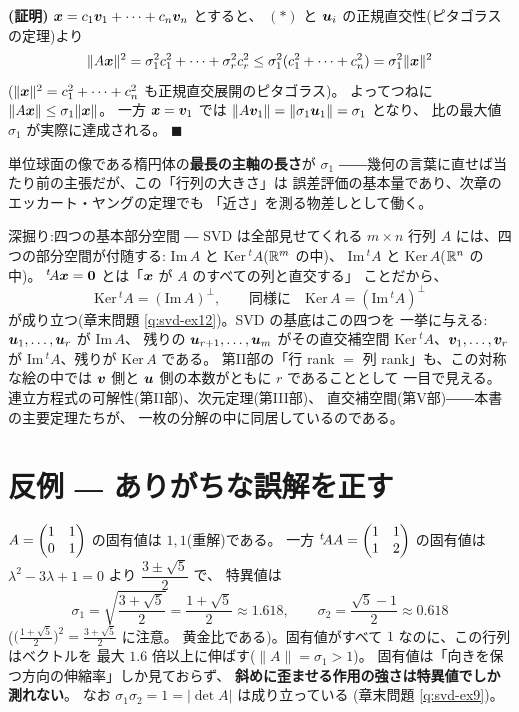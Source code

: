 \noindent\textbf{(証明)}\quad
$\bm{x} = c_1\bm{v}_1 + \cdots + c_n\bm{v}_n$ とすると、
$(*)$ と $\bm{u}_i$ の正規直交性(ピタゴラスの定理)より
\[
\|A\bm{x}\|^2 = \sigma_1^2 c_1^2 + \cdots + \sigma_r^2 c_r^2
\le \sigma_1^2 (c_1^2 + \cdots + c_n^2) = \sigma_1^2 \|\bm{x}\|^2
\]
($\|\bm{x}\|^2 = c_1^2 + \cdots + c_n^2$ も正規直交展開のピタゴラス)。
よってつねに $\|A\bm{x}\| \le \sigma_1\|\bm{x}\|$。
一方 $\bm{x} = \bm{v}_1$ では
$\|A\bm{v}_1\| = \|\sigma_1\bm{u}_1\| = \sigma_1$ となり、
比の最大値 $\sigma_1$ が実際に達成される。 $\blacksquare$

単位球面の像である楕円体の\textbf{最長の主軸の長さ}が $\sigma_1$
――幾何の言葉に直せば当たり前の主張だが、この「行列の大きさ」は
誤差評価の基本量であり、次章のエッカート・ヤングの定理でも
「近さ」を測る物差しとして働く。

\begin{itembox}[l]{深掘り:四つの基本部分空間 ― SVD は全部見せてくれる}
$m \times n$ 行列 $A$ には、四つの部分空間が付随する:
$\mathrm{Im}\,A$ と $\mathrm{Ker}\,{}^t\!A$($\mathbb{R}^m$ の中)、
$\mathrm{Im}\,{}^t\!A$ と $\mathrm{Ker}\,A$($\mathbb{R}^n$ の中)。
${}^t\!A\bm{x} = \bm{0}$ とは「$\bm{x}$ が $A$ のすべての列と直交する」
ことだから、
\[
\mathrm{Ker}\,{}^t\!A = (\mathrm{Im}\,A)^{\perp}, \qquad
\text{同様に} \quad \mathrm{Ker}\,A = (\mathrm{Im}\,{}^t\!A)^{\perp}
\]
が成り立つ(章末問題 \ref{q:svd-ex12})。SVD の基底はこの四つを
一挙に与える:$\bm{u}_1, \dots, \bm{u}_r$ が $\mathrm{Im}\,A$、
残りの $\bm{u}_{r+1}, \dots, \bm{u}_m$ がその直交補空間
$\mathrm{Ker}\,{}^t\!A$、$\bm{v}_1, \dots, \bm{v}_r$ が
$\mathrm{Im}\,{}^t\!A$、残りが $\mathrm{Ker}\,A$ である。
第II部の「行 rank $=$ 列 rank」も、この対称な絵の中では
$\bm{v}$ 側と $\bm{u}$ 側の本数がともに $r$ であることとして
一目で見える。連立方程式の可解性(第II部)、次元定理(第III部)、
直交補空間(第V部)――本書の主要定理たちが、
一枚の分解の中に同居しているのである。
\end{itembox}

\section{反例 ― ありがちな誤解を正す}

\begin{hanrei}\label{hanrei:svd-eigen}
$A = \begin{pmatrix}1 & 1 \\ 0 & 1\end{pmatrix}$ の固有値は $1, 1$(重解)である。
一方 ${}^t\!AA = \begin{pmatrix}1 & 1 \\ 1 & 2\end{pmatrix}$ の固有値は
$\lambda^2 - 3\lambda + 1 = 0$ より $\dfrac{3 \pm \sqrt{5}}{2}$ で、
特異値は
\[
\sigma_1 = \sqrt{\frac{3 + \sqrt{5}}{2}} = \frac{1 + \sqrt{5}}{2} \approx 1.618,
\qquad
\sigma_2 = \frac{\sqrt{5} - 1}{2} \approx 0.618
\]
($\bigl(\frac{1 + \sqrt{5}}{2}\bigr)^2 = \frac{3 + \sqrt{5}}{2}$ に注意。
黄金比である)。固有値がすべて $1$ なのに、この行列はベクトルを
最大 $1.6$ 倍以上に伸ばす($\|A\| = \sigma_1 > 1$)。
固有値は「向きを保つ方向の伸縮率」しか見ておらず、
\textbf{斜めに歪ませる作用の強さは特異値でしか測れない}。
なお $\sigma_1\sigma_2 = 1 = |\det A|$ は成り立っている
(章末問題 \ref{q:svd-ex9})。
\end{hanrei}

